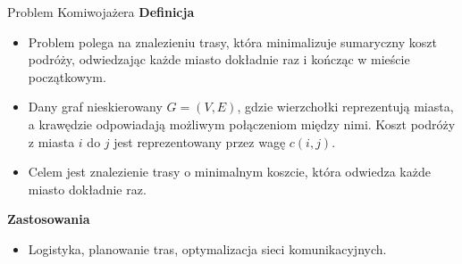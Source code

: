 \begin{frame}{Problem Komiwojażera}
\textbf{Definicja}
\begin{itemize}
	\item Problem polega na znalezieniu trasy, która minimalizuje sumaryczny koszt podróży, odwiedzając każde miasto dokładnie raz i kończąc w mieście początkowym.
	\item Dany graf nieskierowany $G = (V, E)$, gdzie wierzchołki reprezentują miasta, a krawędzie odpowiadają możliwym połączeniom między nimi.
	Koszt podróży z miasta $i$ do $j$ jest reprezentowany przez wagę $c(i,j)$.
	\item Celem jest znalezienie trasy o minimalnym koszcie, która odwiedza każde miasto dokładnie raz.
\end{itemize}
\vspace{10pt}

\textbf{Zastosowania}
\begin{itemize}
	\item Logistyka, planowanie tras, optymalizacja sieci komunikacyjnych.
\end{itemize}
\end{frame}